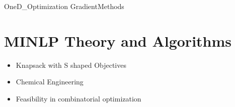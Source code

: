 \documentclass[letter,12pt]{book}
\newcommand{\newslide}{}
\renewcommand{\0}{\mathbf{0}}
\begin{document}


{OneD_Optimization}
{GradientMethods}

\fi









\printbibliography[heading=subbibliography]





\part{MINLP Theory and Algorithms}

%

\newslide

\newslide

\newslide

\newslide
\begin{itemize}
\item Knapsack with S shaped Objectives
\item Chemical Engineering
\item Feasibility in combinatorial optimization
\end{itemize}

\newslide

\newslide
















\end{document}
